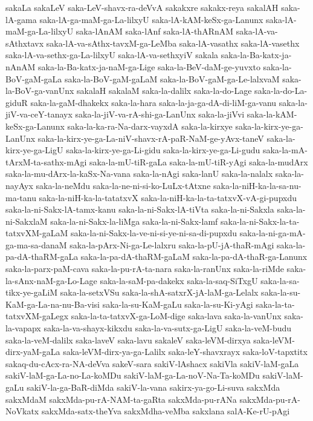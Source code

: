 {sakaLa
sakaLeV
saka-LeV-shavx-ra-deVvA
sakakxre
sakakx-reya
sakalAH
saka-lA-gama
saka-lA-ga-maM-ga-La-lilxyU
saka-lA-kAM-keSx-ga-Lanunx
saka-lA-maM-ga-La-lilxyU
saka-lAnAM
saka-lAnf
saka-lA-thARnAM
saka-lA-va-sAthxtavx
saka-lA-va-sAthx-tavxM-ga-LeMba
saka-lA-vasathx
saka-lA-vasethx
saka-lA-va-sethx-ga-La-lilxyU
saka-lA-va-sethxyiV
sakala
saka-la-Ba-katx-ja-nAnAM
saka-la-Ba-katx-ja-naM-ga-Lige
saka-la-BeV-daM-ge-yuvxto
saka-la-BoV-gaM-gaLa
saka-la-BoV-gaM-gaLaM
saka-la-BoV-gaM-ga-Le-lalxvaM
saka-la-BoV-ga-vanUnx
sakalaH
sakalaM
saka-la-dalilx
saka-la-do-Lage
saka-la-do-La-giduR
saka-la-gaM-dhakekx
saka-la-hara
saka-la-ja-ga-dA-di-liM-ga-vanu
saka-la-jiV-va-ceY-tanayx
saka-la-jiV-va-rA-shi-ga-LanUnx
saka-la-jiVvi
saka-la-kAM-keSx-ga-Lanunx
saka-la-ka-ra-Na-darx-vayxdA
saka-la-kirxye
saka-la-kirx-ye-ga-LanUnx
saka-la-kirx-ye-ga-La-niV-shavx-rA-paR-NaM-ge-yAvx-taneV
saka-la-kirx-ye-ga-LigU
saka-la-kirx-ye-ga-Li-gidu
saka-la-kirx-ye-ga-Li-gudu
saka-la-mA-tArxM-ta-sathx-mAgi
saka-la-mU-tiR-gaLa
saka-la-mU-tiR-yAgi
saka-la-mudArx
saka-la-mu-dArx-la-kaSx-Na-vana
saka-la-nAgi
saka-lanU
saka-la-nalalx
saka-la-nayAyx
saka-la-neMdu
saka-la-ne-ni-si-ko-LuLx-tAtxne
saka-la-niH-ka-la-sa-nu-ma-tanu
saka-la-niH-ka-la-tatatxvX
saka-la-niH-ka-la-ta-tatxvX-vA-gi-pupxdu
saka-la-ni-Sakx-lA-tamx-kanu
saka-la-ni-Sakx-lA-tiVta
saka-la-ni-Sakxla
saka-la-ni-SakxlaM
saka-la-ni-Sakx-la-liMga
saka-la-ni-Sakx-lamf
saka-la-ni-Sakx-la-ta-tatxvXM-gaLaM
saka-la-ni-Sakx-la-ve-ni-si-ye-ni-sa-di-pupxdu
saka-la-ni-ga-mA-ga-ma-sa-danaM
saka-la-pArx-Ni-ga-Le-lalxru
saka-la-pU-jA-thaR-mAgi
saka-la-pa-dA-thaRM-gaLa
saka-la-pa-dA-thaRM-gaLaM
saka-la-pa-dA-thaR-ga-Lanunx
saka-la-parx-paM-cava
saka-la-pu-rA-ta-nara
saka-la-ranUnx
saka-la-riMde
saka-la-sAnx-naM-ga-Lo-Lage
saka-la-saM-pa-dakekx
saka-la-saq-SiTxgU
saka-la-sa-tikx-ye-gaLiM
saka-la-setxVSu
saka-la-shA-satxrX-jA-laM-ga-Lelalx
saka-la-su-KaM-ga-La-na-nu-Ba-visi
saka-la-su-KaM-gaLu
saka-la-su-Ki-yAgi
saka-la-ta-tatxvXM-gaLegx
saka-la-ta-tatxvX-ga-LoM-dige
saka-lava
saka-la-vanUnx
saka-la-vapapx
saka-la-va-shayx-kikxdu
saka-la-va-sutx-ga-LigU
saka-la-veM-budu
saka-la-veM-dalilx
saka-laveV
saka-lavu
sakaleV
saka-leVM-dirxya
saka-leVM-dirx-yaM-gaLa
saka-leVM-dirx-ya-ga-Lalilx
saka-leY-shavxrayx
saka-loV-tapxtitx
sakaq-du-cAcx-ra-NA-deVva
sakeV-sara
sakiV-lAshacx
sakiVla
sakiV-laM-gaLa
sakiV-laM-ga-La-no-La-koMDu
sakiV-laM-ga-La-noV-Na-Ta-koMDu
sakiV-laM-gaLu
sakiV-la-ga-BaR-diMda
sakiV-la-vana
sakirx-ya-go-Li-suva
sakxMda
sakxMdaM
sakxMda-pu-rA-NAM-ta-gaRta
sakxMda-pu-rANa
sakxMda-pu-rA-NoVkatx
sakxMda-satx-theYva
sakxMdha-veMba
sakxlana
salA-Ke-rU-pAgi
}
